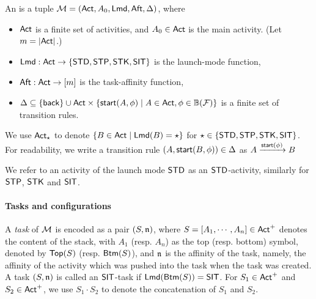 \begin{definition} \label{def:afsm}
An {\AMASS} is a tuple ${\mathcal{M} } = ({\sf Act}, A_0, {\sf Lmd}, {\sf Aft}, \Delta)$, where 
\begin{itemize}
\item ${\sf Act}$ is a finite set of activities, and $A_0 \in {\sf Act}$ is the main activity. (Let $m=|{\sf Act}|$.)
\item ${\sf Lmd} : {\sf Act} \rightarrow \{{\sf STD},{\sf STP},{\sf STK},{\sf SIT}\}$ is the launch-mode function,
%
\item ${\sf Aft} : {\sf Act} \rightarrow [m]$ is the task-affinity function, 
%
\item $\Delta \subseteq \{{\mathsf{back} }\} \cup {\sf Act} \times \{{\mathsf{start} }(A,\phi)\mid A \in {\sf Act}, \phi \in \mathbb{B}(\mathcal{F})\}$ is a finite set of transition rules.
\end{itemize}
%
\end{definition}
We use ${\sf Act}_{\star}$ to denote $\{B\in{\sf Act}\mid {\sf Lmd}(B)= \star\}$ for $\star\in\{\mathsf{STD},\mathsf{STP},\mathsf{STK},\mathsf{SIT}\}$.
For readability, we write a transition rule $(A, {\mathsf{start} }(B, \phi))\in \Delta$ as $A \xrightarrow{{\mathsf{start} }(\phi)} B$


We refer to an activity of the launch mode $\mathsf{STD}$ as an $\mathsf{STD}$-activity, similarly for $\mathsf{STP}$, $\mathsf{STK}$ and $\mathsf{SIT}$. 



\paragraph{Tasks and configurations} A \emph{task} of ${\mathcal{M} }$ is encoded as a pair $(S, \mathfrak{n})$, where $S= [A_1, \cdots, A_n] \in {\sf Act}^+$ denotes the content of the stack, with $A_1$ (resp. $A_n$) as  the top (resp. bottom) symbol, denoted by $\mathsf{Top}(S)$ (resp. $\mathsf{Btm}(S)$), and $\mathfrak{n}$ is the affinity of the task, namely, the affinity of the activity which was pushed into the task when the task was created. A task $(S, \mathfrak{n})$ is called an $\mathsf{SIT}$-task if ${\sf Lmd}(\mathsf{Btm}(S)) = \mathsf{SIT}$.
For $S_1 \in {\sf Act}^+$ and $S_2 \in {\sf Act}^+$, we use $S_1 \cdot S_2$ to denote the concatenation of $S_1$ and $S_2$.

